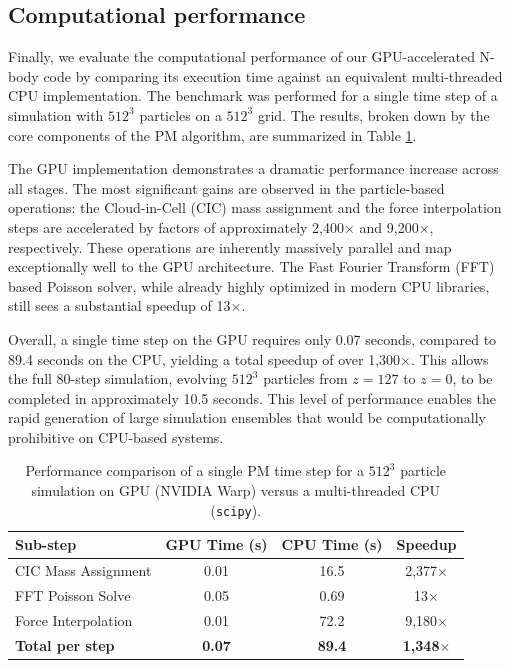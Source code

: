 \documentclass[]{article}
\begin{document}
\subsection{Computational performance}

Finally, we evaluate the computational performance of our GPU-accelerated N-body code by comparing its execution time against an equivalent multi-threaded CPU implementation. The benchmark was performed for a single time step of a simulation with $512^3$ particles on a $512^3$ grid. The results, broken down by the core components of the PM algorithm, are summarized in Table \ref{tab:performance}.

The GPU implementation demonstrates a dramatic performance increase across all stages. The most significant gains are observed in the particle-based operations: the Cloud-in-Cell (CIC) mass assignment and the force interpolation steps are accelerated by factors of approximately 2,400$\times$ and 9,200$\times$, respectively. These operations are inherently massively parallel and map exceptionally well to the GPU architecture. The Fast Fourier Transform (FFT) based Poisson solver, while already highly optimized in modern CPU libraries, still sees a substantial speedup of 13$\times$.

Overall, a single time step on the GPU requires only 0.07 seconds, compared to 89.4 seconds on the CPU, yielding a total speedup of over 1,300$\times$. This allows the full 80-step simulation, evolving $512^3$ particles from $z=127$ to $z=0$, to be completed in approximately 10.5 seconds. This level of performance enables the rapid generation of large simulation ensembles that would be computationally prohibitive on CPU-based systems.

\begin{table}[h!]
\centering
\caption{Performance comparison of a single PM time step for a $512^3$ particle simulation on GPU (NVIDIA Warp) versus a multi-threaded CPU (\texttt{scipy}).}
\label{tab:performance}
\begin{tabular}{lccc}
\hline
\hline
Sub-step & GPU Time (s) & CPU Time (s) & Speedup \\
\hline
CIC Mass Assignment & 0.01 & 16.5 & 2,377$\times$ \\
FFT Poisson Solve & 0.05 & 0.69 & 13$\times$ \\
Force Interpolation & 0.01 & 72.2 & 9,180$\times$ \\
\hline
\textbf{Total per step} & \textbf{0.07} & \textbf{89.4} & \textbf{1,348$\times$} \\
\hline
\end{tabular}
\end{table}
\end{document}
